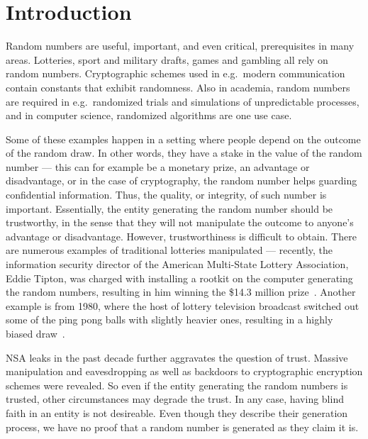 \section{Introduction}\label{cha:introduction}

Random numbers are useful, important, and even critical, prerequisites in many areas. Lotteries, sport and military drafts, games and gambling all rely on random numbers. Cryptographic schemes used in e.g.\ modern communication contain constants that exhibit randomness. Also in academia, random numbers are required in e.g.\ randomized trials and simulations of unpredictable processes, and in computer science, randomized algorithms are one use case.

Some of these examples happen in a setting where people depend on the outcome of the random draw. In other words, they have a stake in the value of the random number --- this can for example be a monetary prize, an advantage or disadvantage, or in the case of cryptography, the random number helps guarding confidential information. Thus, the quality, or integrity, of such number is important. Essentially, the entity generating the random number should be trustworthy, in the sense that they will not manipulate the outcome to anyone's advantage or disadvantage. However, trustworthiness is difficult to obtain. There are numerous examples of traditional lotteries manipulated --- recently, the information security director of the American Multi-State Lottery Association, Eddie Tipton, was charged with installing a rootkit on the computer generating the random numbers, resulting in him winning the \$14.3 million prize~\cite{bbclotteryexploit}. Another example is from 1980, where the host of lottery television broadcast switched out some of the ping pong balls with slightly heavier ones, resulting in a highly biased draw~\cite{lotteryscandal-666}.

NSA leaks in the past decade further aggravates the question of trust. Massive manipulation and eavesdropping as well as backdoors to cryptographic encryption schemes were revealed. So even if the entity generating the random numbers is trusted, other circumstances may degrade the trust. In any case, having blind faith in an entity is not desireable. Even though they describe their generation process, we have no proof that a random number is generated as they claim it is.


